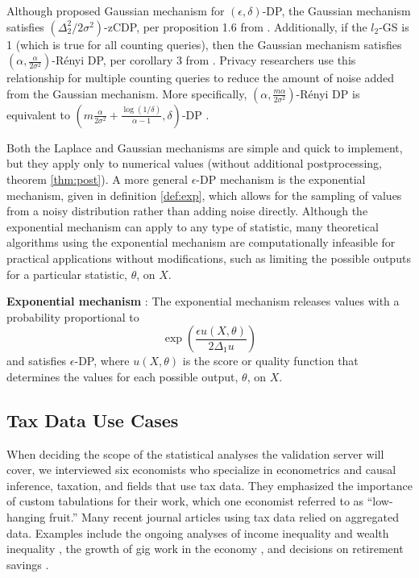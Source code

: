 Although \citet{dwork2014algorithmic} proposed Gaussian mechanism for $(\epsilon,\delta)$-DP, the Gaussian mechanism satisfies $(\Delta^2_2/2\sigma^2)$-zCDP, per proposition 1.6 from \citet{bun2016concentrated}. Additionally, if the $l_2$-GS is 1 (which is true for all counting queries), then the Gaussian mechanism satisfies $\left(\alpha, \frac{\alpha}{2\sigma^2}\right)$-R\'enyi DP, per corollary 3 from  \citet{mironov2017renyi}. Privacy researchers use this relationship for multiple counting queries to reduce the amount of noise added from the Gaussian mechanism. More specifically, $\left(\alpha, \frac{m\alpha}{2\sigma^2}\right)$-R\'enyi DP is equivalent to $\left(m\frac{\alpha}{2\sigma^2}+\frac{\log(1/\delta)}{\alpha-1}, \delta\right)$-DP \citep{mironov2017renyi,wang2019subsampled}.

Both the Laplace and Gaussian mechanisms are simple and quick to implement, but they apply only to numerical values (without additional postprocessing, theorem \ref{thm:post}). A more general $\epsilon$-DP mechanism is the exponential mechanism, given in definition \ref{def:exp}, which allows for the sampling of values from a noisy distribution rather than adding noise directly. Although the exponential mechanism can apply to any type of statistic, many theoretical algorithms using the exponential mechanism are computationally infeasible for practical applications without modifications, such as limiting the possible outputs for a particular statistic, $\theta$, on $X$.

\begin{defn}\label{def:exp} \textbf{Exponential mechanism} \citep{mcsherry2007mechanism}:
    The exponential mechanism releases values with a probability proportional to
        \begin{equation}\label{eqn:exp}
            \exp \left(\frac{\epsilon u(X, \theta)}{2\Delta_1 u}\right)
        \end{equation}
    and satisfies $\epsilon$-DP, where $u(X,\theta)$ is the score or quality function that determines the values for each possible output, $\theta$, on $X$.
\end{defn}

\subsection{Tax Data Use Cases}\label{subsec:data}
When deciding the scope of the statistical analyses the validation server will cover, we interviewed six economists who specialize in econometrics and causal inference, taxation, and fields that use tax data. They emphasized the importance of custom tabulations for their work, which one economist referred to as ``low-hanging fruit.'' Many recent journal articles using tax data relied on aggregated data. Examples include the ongoing analyses of income inequality \citep{auten2018income} and wealth inequality \citep{smith2019top}, the growth of gig work in the economy \citep{collins2019gig}, and decisions on retirement savings \citep{brady2020reconciling}.

